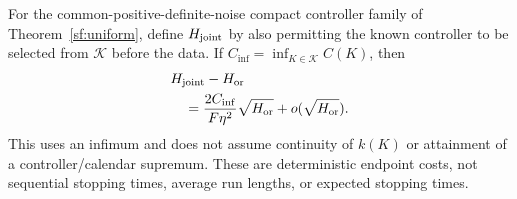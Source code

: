 \begin{corollary}
For the common-positive-definite-noise compact controller family of
Theorem~\ref{sf:uniform}, define $H_{\rm joint}$ by also permitting the
known controller to be selected from $\mathcal K$ before the data. If
$C_{\inf}=\inf_{K\in\mathcal K}C(K)$, then
\begin{equation}\label{sf:endpoint-joint}
\begin{aligned}
&H_{\rm joint}-H_{\rm or}\\
&\quad=\frac{2C_{\inf}}{F\eta^2}\sqrt{H_{\rm or}}
  +o(\sqrt{H_{\rm or}}).
\end{aligned}
\end{equation}
This uses an infimum and does not assume continuity of $k(K)$ or attainment
of a controller/calendar supremum. These are deterministic endpoint costs,
not sequential stopping times, average run lengths, or expected stopping times.
\end{corollary}

